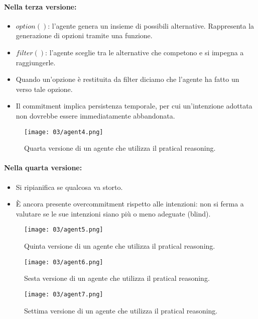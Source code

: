 \paragraph{Nella terza versione:}

\begin{itemize}
  \item $option()$: l'agente genera un insieme di possibili alternative. Rappresenta la generazione di opzioni tramite una funzione. 
  \item $filter()$: l'agente sceglie tra le alternative che competono e si impegna a raggiungerle. 
  \item Quando un'opzione è restituita da filter diciamo che l'agente ha fatto un  verso tale opzione. 
  \item Il commitment implica persistenza temporale, per cui un'intenzione adottata non dovrebbe essere immediatamente abbandonata.
\end{itemize}



\begin{figure}[!h]
    \centering
    \texttt{[image: 03/agent4.png]}
  \caption{Quarta versione di un agente che utilizza il pratical reasoning.}
\end{figure}

\paragraph{Nella quarta versione:}

\begin{itemize}
  \item Si ripianifica se qualcosa va storto. 
  \item È ancora presente overcommitment rispetto alle intenzioni: non si ferma a valutare se le sue intenzioni siano più o meno adeguate (blind). 
\end{itemize}

\begin{figure}[!h]
    \centering
    \texttt{[image: 03/agent5.png]}
  \caption{Quinta versione di un agente che utilizza il pratical reasoning.}
\end{figure}

\begin{figure}[!h]
    \centering
    \texttt{[image: 03/agent6.png]}
  \caption{Sesta versione di un agente che utilizza il pratical reasoning.}
\end{figure}

\begin{figure}[!h]
    \centering
    \texttt{[image: 03/agent7.png]}
  \caption{Settima versione di un agente che utilizza il pratical reasoning.}
\end{figure}




